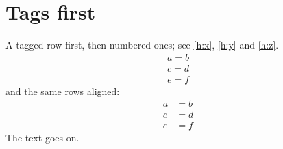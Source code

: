 \documentclass{article}
\begin{document}
\section{Tags first}
A tagged row first, then numbered ones; see \eqref{h:x}, \eqref{h:y} and \eqref{h:z}.
\begin{gather}
a = b \tag{X} \label{h:x} \\
c = d \\
e = f \label{h:y}
\end{gather}
and the same rows aligned:
\begin{align}
a &= b \tag{Z} \label{h:z} \\
c &= d \\
e &= f
\end{align}
The text goes on.
\end{document}
